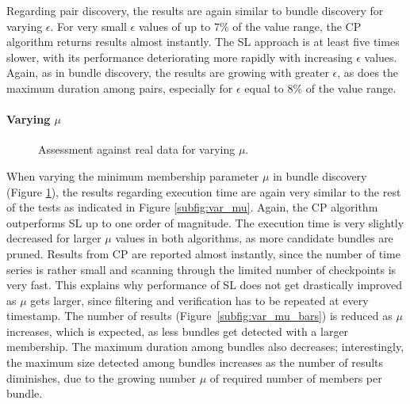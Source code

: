 Regarding pair discovery, the results are again similar to bundle discovery for varying $\epsilon$. For very small $\epsilon$ values of up to 7\% of the value range, the CP algorithm returns results almost instantly. The SL approach is at least five times slower, with its performance deteriorating more rapidly with increasing $\epsilon$ values. Again, as in bundle discovery, the results are growing with greater $\epsilon$, as does the maximum duration among pairs, especially for $\epsilon$ equal to 8\% of the value range.

\paragraph{Varying $\mu$}
\begin{figure}[!b]
 \centering
 \caption{Assessment against real data for varying $\mu$.}
 \label{fig:exp3}
\end{figure}

When varying the minimum membership parameter $\mu$ in bundle discovery (Figure \ref{fig:exp3}), the results regarding execution time are again very similar to the rest of the tests as indicated in Figure \ref{subfig:var_mu}. Again, the CP algorithm outperforms SL up to one order of magnitude. The execution time is very slightly decreased for larger $\mu$ values in both algorithms, as more candidate bundles are pruned. Results from CP are reported almost instantly, since the number of time series is rather small and scanning through the limited number of checkpoints is very fast. This explains why performance of SL does not get drastically improved as $\mu$ gets larger, since filtering and verification has to be repeated at every timestamp. The number of results (Figure~\ref{subfig:var_mu_bars}) is reduced as $\mu$ increases, which is expected, as less bundles get detected with a larger membership. The maximum duration among bundles also decreases; interestingly, the maximum size detected among bundles increases as the number of results diminishes, due to the growing number $\mu$ of required number of members per bundle.

